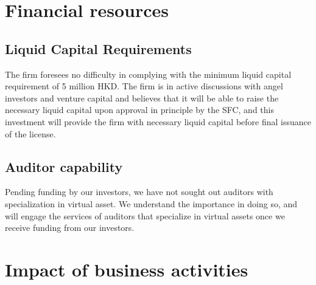 \section{Financial resources}
\subsection{Liquid Capital Requirements}

The firm foresees no difficulty in complying with the minimum liquid
capital requirement of 5 million HKD.  The firm is in active
discussions with angel investors and venture capital and believes that
it will be able to raise the necessary liquid capital upon approval in
principle by the SFC, and this investment will provide the firm with
necessary liquid capital before final issuance of the license.

\subsection{Auditor capability}
Pending funding by our investors, we have not sought out auditors with
specialization in virtual asset.  We understand the importance in
doing so, and will engage the services of auditors that specialize in
virtual assets once we receive funding from our investors.

\section{Impact of business activities}

